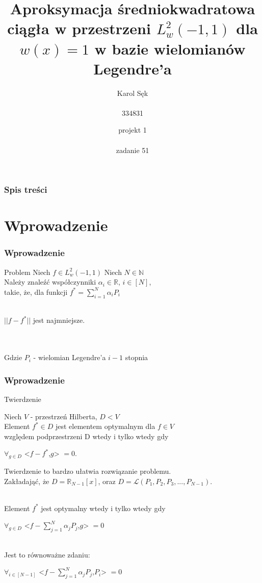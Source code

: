 \documentclass{beamer}
\title{Aproksymacja średniokwadratowa ciągła w przestrzeni $L_w^2(-1,1)$ dla $w(x) = 1$ w bazie wielomianów Legendre'a}
\subtitle{}
\author{Karol Sęk\\~\\
334831}
\institute{grupa 5c\\~\\
czwartek 13:15}
\date{projekt 1\\~\\
zadanie 51}
\begin{document}
\frame{\titlepage}

\begin{frame}
\frametitle{Spis treści}
\tableofcontents
\end{frame}

\section{Wprowadzenie}
\begin{frame}
\frametitle{Wprowadzenie}
\begin{alertblock}{Problem}
    Niech $f \in  L_w^2(-1,1)$ Niech $N \in \mathbb{N}$\\
    Należy znaleźć współczynniki $\alpha_i \in \mathbb{R}$,  $i \in [N]$, \\
    takie, że, dla funkcji $f^* = \sum_{i=1}^{N}\alpha_i P_i$\\
    ~\\
    \centerline{$||f - f^*||$ jest najmniejsze.}\\
    ~\\
    Gdzie $P_i$ - wielomian Legendre'a $i-1$ stopnia\\

\end{alertblock}

\end{frame}


\begin{frame}

\frametitle{Wprowadzenie}
\begin{block}{Twierdzenie}

    Niech $V$ - przestrzeń Hilberta, $D<V$\\
    Element $f^* \in D$ jest elementem optymalnym dla $f \in V$\\
    względem podprzestrzeni D wtedy i tylko wtedy gdy\\
    \centerline{$\forall_{g \in D }$ <$f - f^*$,$g$> $= 0$.}
\end{block}

Twierdzenie to bardzo ułatwia rozwiązanie problemu.\\
Zakładająć, że $D = \mathbb{R}_{N-1}[x]$, oraz $D = \mathcal{L}(P_1, P_2, P_3, ... , P_{N-1}).$\\~\\
\centerline{Element $f^*$ jest optymalny wtedy i tylko wtedy gdy}
\centerline{$\forall_{g \in D }$ <$f - \sum\limits_{j=1}^{N}\alpha_j P_j$,$g$> $= 0$}\\
Jest to równoważne zdaniu:\\
\centerline{$\forall_{i \in [N-1] }$ <$f - \sum\limits_{j=1}^{N}\alpha_j P_j$,$P_i$> $= 0$}\\

\end{frame}
\end{document}
